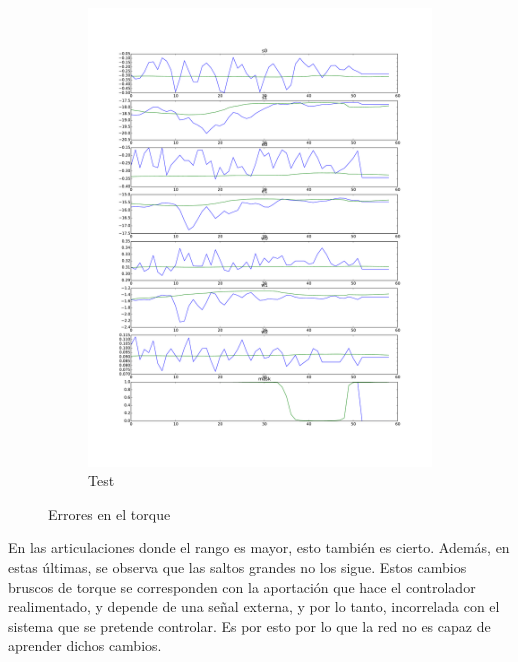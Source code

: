 \begin{figure}
\begin{subfigure}{0.3\textwidth}
		\includegraphics[width=\linewidth]{imagenes/resultados/pred_test.pdf}
		\caption{Test}
		\label{fig:resultados/pred_test}
	\end{subfigure}
	\caption{Errores en el torque}
	\label{fig:resultados/pred}
\end{figure}

En las articulaciones donde el rango es mayor, esto también es cierto. Además, en estas últimas, se observa que las saltos grandes no los sigue. Estos cambios bruscos de torque se corresponden con la aportación que hace el controlador realimentado, y depende de una señal externa, y por lo tanto, incorrelada con el sistema que se pretende controlar. Es por esto por lo que la red no es capaz de aprender dichos cambios.



